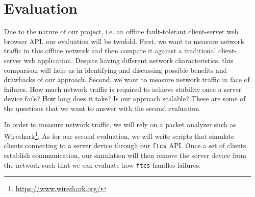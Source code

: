 \section{Evaluation}
\label{sec:evaluation}

Due to the nature of our project, i.e. an offline fault-tolerant client-server web browser API, our evaluation will be twofold. First, we want to measure network traffic in this offline network and then compare it against a traditional client-server web application. Despite having different network characteristics, this comparison will help us in identifying and discussing possible benefits and drawbacks of our approach. Second, we want to measure network traffic in face of failures. How much network traffic is required to achieve stability once a server device fails? How long does it take? Is our approach scalable? These are some of the questions that we want to answer with the second evaluation.

In order to measure network traffic, we will rely on a packet analyzer such as Wireshark\footnote{\url{https://www.wireshark.org/}}. As for our second evaluation, we will write scripts that simulate clients connecting to a server device through our \texttt{ftcs} API. Once a set of clients establish communication, our simulation will then remove the server device from the network such that we can evaluate how \texttt{ftcs} handles failures. 